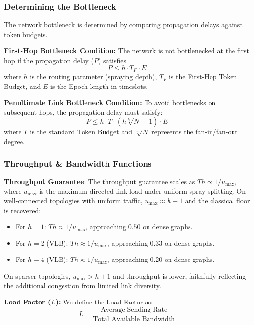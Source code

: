 \documentclass{article}
\begin{document}
    \subsubsection{Determining the Bottleneck}
    The network bottleneck is determined by comparing propagation delays against token budgets.
    
    \textbf{First-Hop Bottleneck Condition:} The network is not bottlenecked at the first hop if the propagation delay ($P$) satisfies:
    \begin{equation}
        P \le h \cdot T_F \cdot E
    \end{equation}
    where $h$ is the routing parameter (spraying depth), $T_F$ is the First-Hop Token Budget, and $E$ is the Epoch length in timeslots.

    \textbf{Penultimate Link Bottleneck Condition:} To avoid bottlenecks on subsequent hops, the propagation delay must satisfy:
    \begin{equation}
        P \le h \cdot T \cdot (h \sqrt[h]{N} - 1) \cdot E
    \end{equation}
    where $T$ is the standard Token Budget and $\sqrt[h]{N}$ represents the fan-in/fan-out degree.

    \subsubsection{Throughput \& Bandwidth Functions}
    \textbf{Throughput Guarantee:} The throughput guarantee scales as $Th \propto 1/u_{\max}$, where $u_{\max}$ is the maximum directed-link load under uniform spray splitting.  On well-connected topologies with uniform traffic, $u_{\max} \approx h{+}1$ and the classical floor is recovered:
    \begin{itemize}
        \item For $h=1$: $Th \approx 1/u_{\max}$, approaching $0.50$ on dense graphs.
        \item For $h=2$ (VLB): $Th \approx 1/u_{\max}$, approaching $0.33$ on dense graphs.
        \item For $h=4$ (VLB): $Th \approx 1/u_{\max}$, approaching $0.20$ on dense graphs.
    \end{itemize}
    On sparser topologies, $u_{\max} > h{+}1$ and throughput is lower, faithfully reflecting the additional congestion from limited link diversity.

    \textbf{Load Factor ($L$):} We define the Load Factor as:
    \begin{equation}
        L = \frac{\text{Average Sending Rate}}{\text{Total Available Bandwidth}}
    \end{equation}
\end{document}
